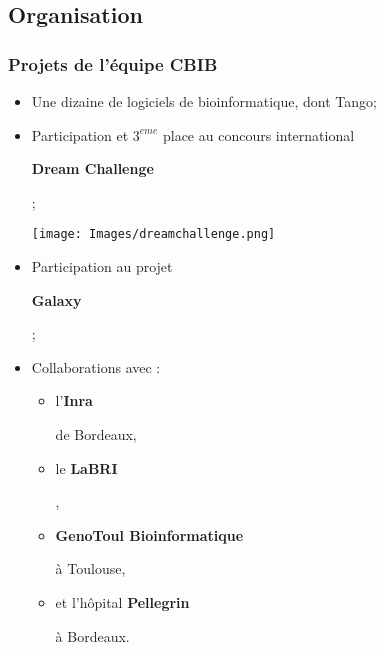 \documentclass{beamer}
\begin{document}
\subsection{Organisation}

\begin{frame}
\tableofcontents[currentsubsection]
\end{frame}

\begin{frame}
\frametitle{Projets de l'équipe CBIB}

\begin{itemize}
\item Une dizaine de logiciels de bioinformatique, dont \alert{Tango};
\pause
\item Participation et $3^{eme}$ place au concours international
\begin{flushcenter}\bf Dream Challenge \end{flushcenter};

\begin{center}
\texttt{[image: Images/dreamchallenge.png]}
\end{center}

\pause
\item Participation au projet
\begin{flushcenter}\bf Galaxy \end{flushcenter};
\pause
\item Collaborations avec :
     \begin{itemize}
     \item 
      \begin{flushcenter} l'\bf Inra\end{flushcenter} de Bordeaux, 
     \pause
     \item 
     \begin{flushcenter} le \bf LaBRI\end{flushcenter}, 
     \pause
     \item  
     \begin{flushcenter} \bf GenoToul Bioinformatique\end{flushcenter} à Toulouse, 
     \pause
     \item 
     \begin{flushcenter} et l'hôpital \bf Pellegrin\end{flushcenter} à Bordeaux.
     \end{itemize}
\end{itemize}

\end{frame}
\end{document}
